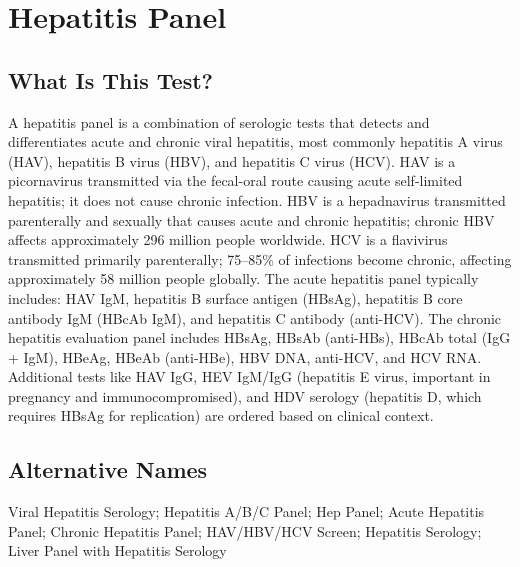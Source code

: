 \chapter{Hepatitis Panel}

\section*{What Is This Test?}
A hepatitis panel is a combination of serologic tests that detects and differentiates acute and chronic viral hepatitis, most commonly hepatitis A virus (HAV), hepatitis B virus (HBV), and hepatitis C virus (HCV). HAV is a picornavirus transmitted via the fecal-oral route causing acute self-limited hepatitis; it does not cause chronic infection. HBV is a hepadnavirus transmitted parenterally and sexually that causes acute and chronic hepatitis; chronic HBV affects approximately 296 million people worldwide. HCV is a flavivirus transmitted primarily parenterally; 75--85\% of infections become chronic, affecting approximately 58 million people globally. The acute hepatitis panel typically includes: HAV IgM, hepatitis B surface antigen (HBsAg), hepatitis B core antibody IgM (HBcAb IgM), and hepatitis C antibody (anti-HCV). The chronic hepatitis evaluation panel includes HBsAg, HBsAb (anti-HBs), HBcAb total (IgG + IgM), HBeAg, HBeAb (anti-HBe), HBV DNA, anti-HCV, and HCV RNA. Additional tests like HAV IgG, HEV IgM/IgG (hepatitis E virus, important in pregnancy and immunocompromised), and HDV serology (hepatitis D, which requires HBsAg for replication) are ordered based on clinical context.

\section*{Alternative Names}
Viral Hepatitis Serology; Hepatitis A/B/C Panel; Hep Panel; Acute Hepatitis Panel; Chronic Hepatitis Panel; HAV/HBV/HCV Screen; Hepatitis Serology; Liver Panel with Hepatitis Serology

